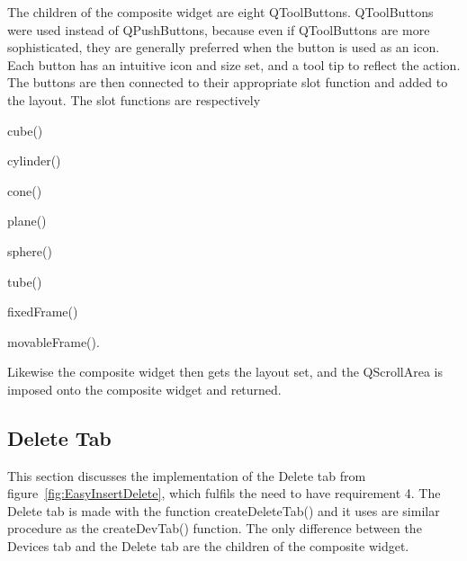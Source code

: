 The children of the composite widget are eight QToolButtons. QToolButtons were used instead of QPushButtons, because even if QToolButtons are more sophisticated, they are generally preferred when the button is used as an icon. Each button has an intuitive icon and size set, and a tool tip to reflect the action. The buttons are then connected to their appropriate slot function and added to the layout. The slot functions are respectively \begin{enumerate*}[font={\color{red!50!black}\bfseries}]
\item cube()
\item cylinder()
\item cone()
\item plane()
\item sphere()
\item tube()
\item fixedFrame()
\item movableFrame().
\end{enumerate*}    
Likewise the composite widget then gets the layout set, and the QScrollArea is imposed onto the composite widget and returned.

\subsection{Delete Tab}
\label{sec:DelTab}

This section discusses the implementation of the Delete tab from figure~\ref{fig:EasyInsertDelete}, which fulfils the need to have requirement 4. The Delete tab is made with the function createDeleteTab() and it uses are similar procedure as the createDevTab() function. The only difference between the Devices tab and the Delete tab are the children of the composite widget.

